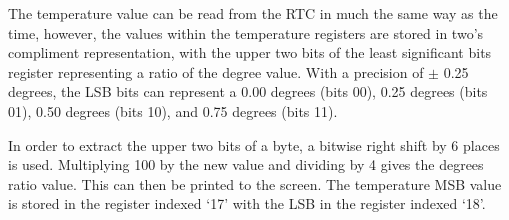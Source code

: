 The temperature value can be read from the RTC in much the same way as the time,
however, the values within the temperature registers are stored in two's
compliment representation, with the upper two bits of the least significant bits
register representing a ratio of the degree value. With a precision of $\pm$
0.25 degrees, the LSB bits can represent a 0.00 degrees (bits 00), 0.25 degrees
(bits 01), 0.50 degrees (bits 10), and 0.75 degrees (bits 11).



In order to extract the upper two bits of a byte, a bitwise right shift by 6
places is used. Multiplying 100 by the new value and dividing by 4 gives the
degrees ratio value. This can then be printed to the screen. The temperature MSB
value is stored in the register indexed `17' with the LSB in the register
indexed `18'.
